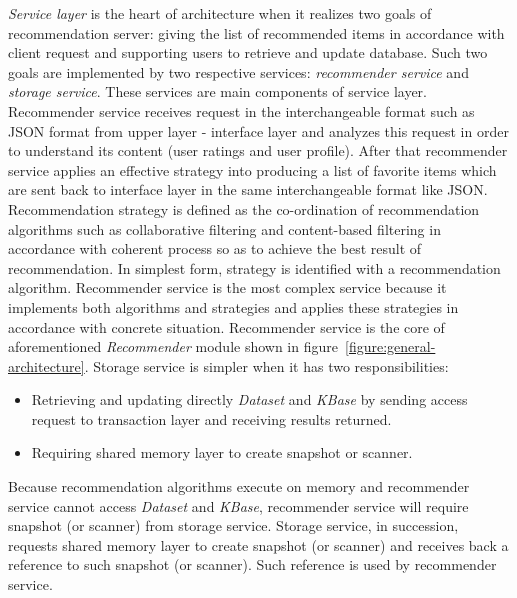 \documentclass[a4paper,twoside]{article}
\begin{document}
\textit{Service layer} is the heart of architecture when it realizes two goals of recommendation server: giving the list of recommended items in accordance with client request and supporting users to retrieve and update database. Such two goals are implemented by two respective services: \textit{recommender service} and \textit{storage service}. These services are main components of service layer. Recommender service receives request in the interchangeable format such as JSON format from upper layer - interface layer and analyzes this request in order to understand its content (user ratings and user profile). After that recommender service applies an effective strategy into producing a list of favorite items which are sent back to interface layer in the same interchangeable format like JSON. Recommendation strategy is defined as the co-ordination of recommendation algorithms such as collaborative filtering and content-based filtering in accordance with coherent process so as to achieve the best result of recommendation. In simplest form, strategy is identified with a recommendation algorithm. Recommender service is the most complex service because it implements both algorithms and strategies and applies these strategies in accordance with concrete situation. Recommender service is the core of aforementioned \textit{Recommender} module shown in figure~\ref{figure:general-architecture}. Storage service is simpler when it has two responsibilities:
\begin{itemize}
\item Retrieving and updating directly \textit{Dataset} and \textit{KBase} by sending access request to transaction layer and receiving results returned.
\item Requiring shared memory layer to create snapshot or scanner.
\end{itemize}
Because recommendation algorithms execute on memory and recommender service cannot access \textit{Dataset} and \textit{KBase}, recommender service will require snapshot (or scanner) from storage service. Storage service, in succession, requests shared memory layer to create snapshot (or scanner) and receives back a reference to such snapshot (or scanner). Such reference is used by recommender service.
\end{document}

